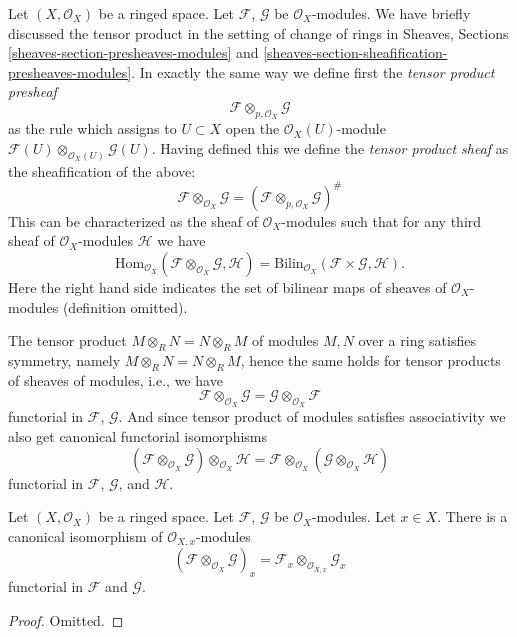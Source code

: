 \noindent
Let $(X, \mathcal{O}_X)$ be a ringed space.
Let $\mathcal{F}$, $\mathcal{G}$ be $\mathcal{O}_X$-modules.
We have briefly discussed the tensor product in the setting
of change of rings in Sheaves, Sections
\ref{sheaves-section-presheaves-modules} and
\ref{sheaves-section-sheafification-presheaves-modules}.
In exactly the same way we define first the {\it tensor
product presheaf}
$$
\mathcal{F} \otimes_{p, \mathcal{O}_X} \mathcal{G}
$$
as the rule which assigns to $U \subset X$ open the
$\mathcal{O}_X(U)$-module
$\mathcal{F}(U) \otimes_{\mathcal{O}_X(U)} \mathcal{G}(U)$.
Having defined this we define the {\it tensor product sheaf}
as the sheafification of the above:
$$
\mathcal{F} \otimes_{\mathcal{O}_X} \mathcal{G}
=
(\mathcal{F} \otimes_{p, \mathcal{O}_X} \mathcal{G})^\#
$$
This can be characterized as the sheaf of
$\mathcal{O}_X$-modules such that for any third
sheaf of $\mathcal{O}_X$-modules $\mathcal{H}$
we have
$$
\text{Hom}_{\mathcal{O}_X}
(\mathcal{F} \otimes_{\mathcal{O}_X} \mathcal{G}, \mathcal{H})
=
\text{Bilin}_{\mathcal{O}_X}(\mathcal{F} \times \mathcal{G}, \mathcal{H}).
$$
Here the right hand side indicates the set of bilinear maps of sheaves
of $\mathcal{O}_X$-modules (definition omitted).

\medskip\noindent
The tensor product $M\otimes_R N = N \otimes_R M$ of modules
$M, N$ over a ring satisfies symmetry, namely
$M\otimes_R N = N \otimes_R M$, hence the same holds for
tensor products of sheaves of modules, i.e., we have
$$
\mathcal{F} \otimes_{\mathcal{O}_X} \mathcal{G}
=
\mathcal{G} \otimes_{\mathcal{O}_X} \mathcal{F}
$$
functorial in $\mathcal{F}$, $\mathcal{G}$.
And since tensor product of modules satisfies associativity we
also get canonical functorial isomorphisms
$$
(\mathcal{F} \otimes_{\mathcal{O}_X} \mathcal{G})
\otimes_{\mathcal{O}_X} \mathcal{H}
=
\mathcal{F} \otimes_{\mathcal{O}_X}
(\mathcal{G} \otimes_{\mathcal{O}_X} \mathcal{H})
$$
functorial in $\mathcal{F}$, $\mathcal{G}$, and $\mathcal{H}$.

\begin{lemma}
\label{lemma-stalk-tensor-product}
Let $(X, \mathcal{O}_X)$ be a ringed space.
Let $\mathcal{F}$, $\mathcal{G}$ be $\mathcal{O}_X$-modules.
Let $x \in X$. There is a canonical isomorphism
of $\mathcal{O}_{X, x}$-modules
$$
(\mathcal{F} \otimes_{\mathcal{O}_X} \mathcal{G})_x
=
\mathcal{F}_x \otimes_{\mathcal{O}_{X, x}} \mathcal{G}_x
$$
functorial in $\mathcal{F}$ and $\mathcal{G}$.
\end{lemma}

\begin{proof}
Omitted.
\end{proof}

